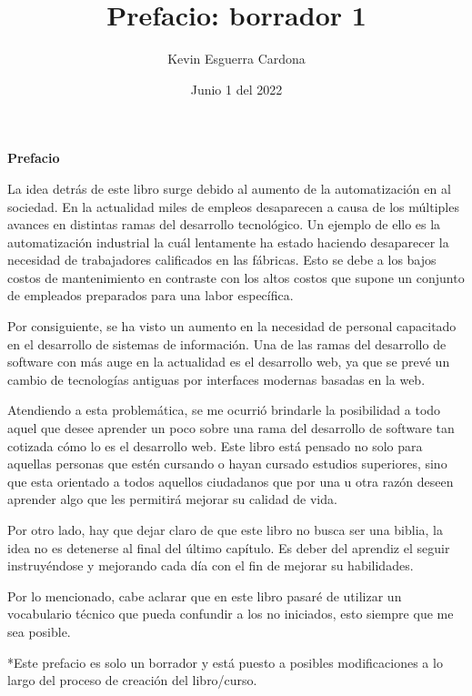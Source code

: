 \documentclass{article}
\title{Prefacio: borrador 1}
\author{Kevin  Esguerra Cardona}
\date{Junio 1 del 2022}
\begin{document}
\maketitle

\textbf{Prefacio}

La idea detrás de este libro surge debido al aumento de la automatización en al sociedad. En la actualidad miles de empleos desaparecen 
a causa de los múltiples avances en distintas ramas del desarrollo tecnológico. Un ejemplo de ello es la automatización industrial la cuál 
lentamente ha estado haciendo desaparecer la necesidad de trabajadores calificados en las fábricas. Esto se debe a los bajos costos de
mantenimiento en contraste con los altos costos que supone un conjunto de empleados preparados para una labor específica. 

Por consiguiente, se ha visto un aumento en la necesidad de personal capacitado en el desarrollo de sistemas de información. Una de las
ramas del desarrollo de software con más auge en la actualidad es el desarrollo web, ya que se prevé un cambio de tecnologías antiguas por
interfaces modernas basadas en la web. 

Atendiendo a esta problemática, se me ocurrió brindarle la posibilidad a todo aquel que desee aprender un poco sobre una rama del desarrollo
de software tan cotizada cómo lo es el desarrollo web. Este libro está pensado no solo para aquellas personas que estén cursando o hayan 
cursado estudios superiores, sino que esta orientado a todos aquellos ciudadanos que por una u otra razón deseen aprender algo que les
permitirá mejorar su calidad de vida. 

Por otro lado, hay que dejar claro de que este libro no busca ser una biblia, la idea no es detenerse al final del último 
capítulo. Es deber del aprendiz el seguir instruyéndose y mejorando cada día con el fin de mejorar su habilidades.

Por lo mencionado, cabe aclarar que en este libro pasaré de utilizar un vocabulario técnico que pueda confundir a los no iniciados, esto siempre que me sea posible.

*Este prefacio es solo un borrador y está puesto a posibles modificaciones a lo largo del proceso de creación del libro/curso.
\end{document}
